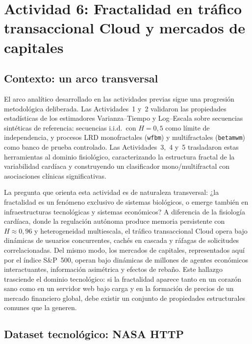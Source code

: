 \newpage
\section{Actividad 6: Fractalidad en tráfico transaccional Cloud y mercados de capitales}

\subsection{Contexto: un arco transversal}

El arco analítico desarrollado en las actividades previas sigue una progresión
metodológica deliberada. Las Actividades~1 y~2 validaron las propiedades
estadísticas de los estimadores Varianza--Tiempo y Log--Escala sobre secuencias
sintéticas de referencia: secuencias i.i.d.\ con $H=0{,}5$ como límite de
independencia, y procesos LRD monofractales (\texttt{wfbm}) y multifractales
(\texttt{betamwm}) como banco de prueba controlado. Las Actividades~3,~4 y~5
trasladaron estas herramientas al dominio fisiológico, caracterizando la
estructura fractal de la variabilidad cardíaca y construyendo un clasificador
mono/multifractal con asociaciones clínicas significativas.

La pregunta que orienta esta actividad es de naturaleza transversal: ¿la
fractalidad es un fenómeno exclusivo de sistemas biológicos, o emerge también en
infraestructuras tecnológicas y sistemas económicos? A diferencia de la fisiología cardíaca, donde la
regulación autónoma produce memoria persistente con $H\approx0{,}96$ y
heterogeneidad multiescala, el tráfico transaccional Cloud opera bajo dinámicas
de usuarios concurrentes, cachés en cascada y ráfagas de solicitudes
correlacionadas. Del mismo modo, los mercados de capitales, representados aquí
por el índice S\&P~500, operan bajo dinámicas de millones de agentes económicos
interactuantes, información asimétrica y efectos de rebaño. Este hallazgo trasciende el dominio tecnológico: si la
fractalidad aparece tanto en un corazón sano como en un servidor web bajo carga
y en la formación de precios de un mercado financiero global,
debe existir un conjunto de propiedades estructurales comunes que la generen.

\subsection{Dataset tecnológico: NASA HTTP}

